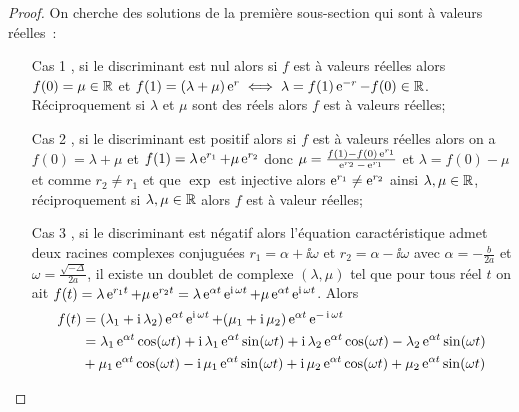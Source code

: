 \begin{proof}
    On cherche des solutions de la première sous-section qui sont à valeurs réelles~:
    \begin{enumerate}
        \item[Cas 1], si le discriminant est nul alors si \(f\) est à valeurs 
            réelles alors \(f(0) = \mu \in \mathbb{R}\) et \(f(1) = (\lambda + \mu)\operatorname{e}^r 
            \iff \lambda = f(1)\operatorname{e}^{-r}-f(0) \in \mathbb{R}\). Réciproquement si 
            \(\lambda\) et \(\mu\) sont des réels alors \(f\) est à valeurs 
            réelles;
        \item[Cas 2], si le discriminant est positif alors si \(f\) est à valeurs 
            réelles alors on a \(f(0) = \lambda + \mu\) et \(f(1) = \lambda 
            \operatorname{e}^{r_1} + \mu \operatorname{e}^{r_2}\) donc \(\mu = 
            \frac{f(1)-f(0)\operatorname{e}^{r_1}}{\operatorname{e}^{r_2}-\operatorname{e}^{r_1}}\) et \(\lambda = f(0) - 
            \mu\) et comme \(r_2 \neq r_1\) et que \(\exp\) est injective alors 
            \(\operatorname{e}^{r_1} \neq \operatorname{e}^{r_2}\) ainsi \(\lambda, \mu \in \mathbb{R}\), 
            réciproquement si \(\lambda, \mu \in \mathbb{R}\) alors \(f\) est à valeur 
            réelles;
        \item[Cas 3], si le discriminant est négatif alors l'équation 
            caractéristique admet deux racines complexes conjuguées \(r_1 = 
            \alpha + \ii \omega\) et \(r_2 = \alpha-\ii \omega\) avec \(\alpha = 
            -\frac{b}{2a}\) et \(\omega = \frac{\sqrt{-\Delta}}{2a}\), il existe 
            un doublet de complexe \((\lambda, \mu)\) tel que pour tous réel 
            \(t\) on ait \(f(t) = \lambda \operatorname{e}^{r_1 t} + \mu \operatorname{e}^{r_2 t} = \lambda 
            \operatorname{e}^{\alpha t} \operatorname{e}^{\operatorname{i} \omega t} + \mu \operatorname{e}^{\alpha t} \operatorname{e}^{\operatorname{i} \omega 
            t}\). Alors
            \begin{align}
                f(t)& = (\lambda_1 + \ii \lambda_2) \e^{\alpha t} \e^{\ii \omega 
                t}  + (\mu_1 + \ii \mu_2) \e^{\alpha t} \e^{-\ii \omega t} \\
                    &= \lambda_1\e^{\alpha t} \cos(\omega t) + \ii \lambda_1 
                    \e^{\alpha t} \sin(\omega t) + \ii \lambda_2 \e^{\alpha t} 
                    \cos(\omega t) - \lambda_2 \e^{\alpha t} \sin(\omega t) 
                    \notag \\
                    &+ \mu_1\e^{\alpha t}\cos(\omega t) -\ii \mu_1 \e^{\alpha t} 
                    \sin(\omega t) + \ii\mu_2 \e^{\alpha t} \cos(\omega t) + 
                    \mu_2 \e^{\alpha t} \sin(\omega t) \\

\end{align}
\end{enumerate}
\end{proof}
